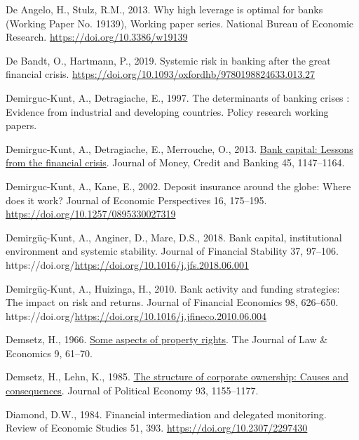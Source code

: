 \documentclass[
  12pt,
  a4paper,
  DIV=11,
  numbers=noendperiod]{scrreprt}
\newlength{\cslhangindent}
\newenvironment{CSLReferences}[2] %
 {\begin{list}{}{%
  \setlength{\itemindent}{0pt}
  \setlength{\leftmargin}{0pt}
  \setlength{\parsep}{0pt}
  \ifodd #1
   \setlength{\leftmargin}{\cslhangindent}
   \setlength{\itemindent}{-1\cslhangindent}
  \fi
  \setlength{\itemsep}{#2\baselineskip}}}
 {\end{list}}
\begin{document}
\begin{CSLReferences}{1}{0}
De Angelo, H., Stulz, R.M., 2013. Why high leverage is optimal for banks
(Working Paper No. 19139), Working paper series. National Bureau of
Economic Research. \url{https://doi.org/10.3386/w19139}

De Bandt, O., Hartmann, P., 2019. Systemic risk in banking after the
great financial crisis.
\url{https://doi.org/10.1093/oxfordhb/9780198824633.013.27}

Demirguc-Kunt, A., Detragiache, E., 1997. The determinants of banking
crises : Evidence from industrial and developing countries. Policy
research working papers.

Demirguc-Kunt, A., Detragiache, E., Merrouche, O., 2013.
\href{http://www.jstor.org.queens.ezp1.qub.ac.uk/stable/23463595}{Bank
capital: Lessons from the financial crisis}. Journal of Money, Credit
and Banking 45, 1147--1164.

Demirguc-Kunt, A., Kane, E., 2002. Deposit insurance around the globe:
Where does it work? Journal of Economic Perspectives 16, 175--195.
\url{https://doi.org/10.1257/0895330027319}

Demirgüç-Kunt, A., Anginer, D., Mare, D.S., 2018. Bank capital,
institutional environment and systemic stability. Journal of Financial
Stability 37, 97--106.
https://doi.org/\url{https://doi.org/10.1016/j.jfs.2018.06.001}

Demirgüç-Kunt, A., Huizinga, H., 2010. Bank activity and funding
strategies: The impact on risk and returns. Journal of Financial
Economics 98, 626--650.
https://doi.org/\url{https://doi.org/10.1016/j.jfineco.2010.06.004}

Demsetz, H., 1966. \href{http://www.jstor.org/stable/724993}{Some
aspects of property rights}. The Journal of Law \& Economics 9, 61--70.

Demsetz, H., Lehn, K., 1985.
\href{http://www.jstor.org/stable/1833178}{The structure of corporate
ownership: Causes and consequences}. Journal of Political Economy 93,
1155--1177.

Diamond, D.W., 1984. Financial intermediation and delegated monitoring.
Review of Economic Studies 51, 393.
\url{https://doi.org/10.2307/2297430}


\end{CSLReferences}
\end{document}
